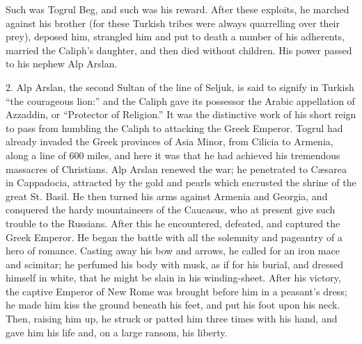 Such was Togrul Beg, and such
was his reward. After these exploits, he marched against his brother
(for these Turkish tribes were always quarrelling over their prey),
deposed him, strangled him and put to death a number of his adherents,
married the Caliph's daughter, and then died without children. His
power passed to his nephew Alp Arslan.

2. Alp Arslan, the second
Sultan of the line of Seljuk, is said to signify in Turkish ``the
courageous lion:'' and the Caliph gave its possessor the Arabic
appellation of Azzaddin, or ``Protector of Religion.'' It was the
distinctive work of his short reign to pass from humbling the Caliph
to attacking the Greek Emperor. Togrul had already invaded the Greek
provinces of Asia Minor, from Cilicia to Armenia, along a line of 600
miles, and here it was that he had achieved his tremendous massacres
of Christians. Alp Arslan renewed the war; he penetrated to Cæsarea
in Cappadocia, attracted by the gold and pearls which encrusted the
shrine of the great St. Basil. He then turned his arms against Armenia
and Georgia, and conquered the hardy mountaineers of the Caucasus, who
at present give such trouble to the Russians. After this he
encountered, defeated, and captured the Greek Emperor. He began the
battle with all the solemnity and pageantry of a hero of romance.
Casting away his bow and arrows, he called for an iron mace and
scimitar; he perfumed his body with musk, as if for his burial, and
dressed himself in white, that he might be slain in his winding-sheet.
After his victory, the captive Emperor of New Rome was brought before
him in a peasant's dress; he made him kiss the ground beneath his
feet, and put his foot upon his neck. Then, raising him up, he struck
or patted him three times with his hand, and gave him his life and, on
a large ransom, his liberty.

